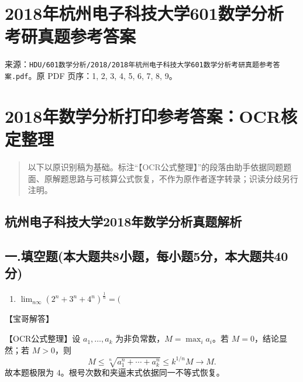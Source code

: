 \documentclass[11pt,fontset=fandol]{ctexart}
\providecommand{\tightlist}{\setlength{\itemsep}{0pt}\setlength{\parskip}{0pt}}
\begin{document}
\section{2018年杭州电子科技大学601数学分析考研真题参考答案}\label{ux5e74ux676dux5ddeux7535ux5b50ux79d1ux6280ux5927ux5b66601ux6570ux5b66ux5206ux6790ux8003ux7814ux771fux9898ux53c2ux8003ux7b54ux6848}

来源：\texttt{HDU/601数学分析/2018/2018年杭州电子科技大学601数学分析考研真题参考答案.pdf}。原
PDF 页序：1, 2, 3, 4, 5, 6, 7, 8, 9。

\section{2018年数学分析打印参考答案：OCR核定整理}\label{ux5e74ux6570ux5b66ux5206ux6790ux6253ux5370ux53c2ux8003ux7b54ux6848ocrux6838ux5b9aux6574ux7406}

\begin{quote}
以下以原识别稿为基础。标注``【OCR公式整理】''的段落由助手依据同题题面、原解题思路与可核算公式恢复，不作为原作者逐字转录；识读分歧另行注明。
\end{quote}

\subsection{杭州电子科技大学2018年数学分析真题解析}\label{ux676dux5ddeux7535ux5b50ux79d1ux6280ux5927ux5b662018ux5e74ux6570ux5b66ux5206ux6790ux771fux9898ux89e3ux6790}

\subsection{一.填空题(本大题共8小题，每小题5分，本大题共40分)}\label{ux4e00.ux586bux7a7aux9898ux672cux5927ux9898ux51718ux5c0fux9898ux6bcfux5c0fux98985ux5206ux672cux5927ux9898ux517140ux5206}

\begin{enumerate}
\def\labelenumi{\arabic{enumi}.}
\tightlist
\item
  \(\lim _ { n  \infty } ( 2 ^ { n } + 3 ^ { n } + 4 ^ { n } ) ^ { \frac { 1 } { n } } = (\)
\end{enumerate}

【宝哥解答】

【OCR公式整理】设 \(a_1,\ldots,a_k\) 为非负常数，\(M=\max_i a_i\)。若
\(M=0\)，结论显然；若 \(M>0\)，则 \[
M\le\sqrt[n]{a_1^n+\cdots+a_k^n}\le k^{1/n}M\longrightarrow M.
\] 故本题极限为 \(4\)。根号次数和夹逼末式依据同一不等式恢复。
\end{document}

